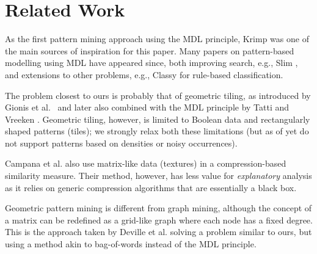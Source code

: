 \documentclass{llncs}
\begin{document}
\section{Related Work}

As the first pattern mining approach using the MDL principle, Krimp \cite{krimp} was one of the main sources of inspiration for this paper. Many papers on pattern-based modelling using MDL have appeared since, both improving search, e.g., Slim \cite{slim}, and extensions to other problems, e.g., Classy \cite{classy} for rule-based classification.

The problem closest to ours is probably that of geometric tiling, as introduced by Gionis et al.\ \cite{gionis2004tiles} and later also combined with the MDL principle by Tatti and Vreeken \cite{tatti2012stijl}. Geometric tiling, however, is limited to Boolean data and rectangularly shaped patterns (tiles); we strongly relax both these limitations (but as of yet do not support patterns based on densities or noisy occurrences).

Campana et al. \cite{campana2010compression} also use matrix-like data (textures) in a compression-based similarity measure. Their method, however, has less value for \emph{explanatory} analysis as it relies on generic compression algorithms that are essentially a black box.


Geometric pattern mining is different from graph mining, although the concept of a matrix can be redefined as a grid-like graph where each node has a fixed degree. This is the approach taken by Deville et al. \cite{deville2016grima} solving a problem similar to ours, but using a method akin to bag-of-words instead of the MDL principle.
\end{document}

